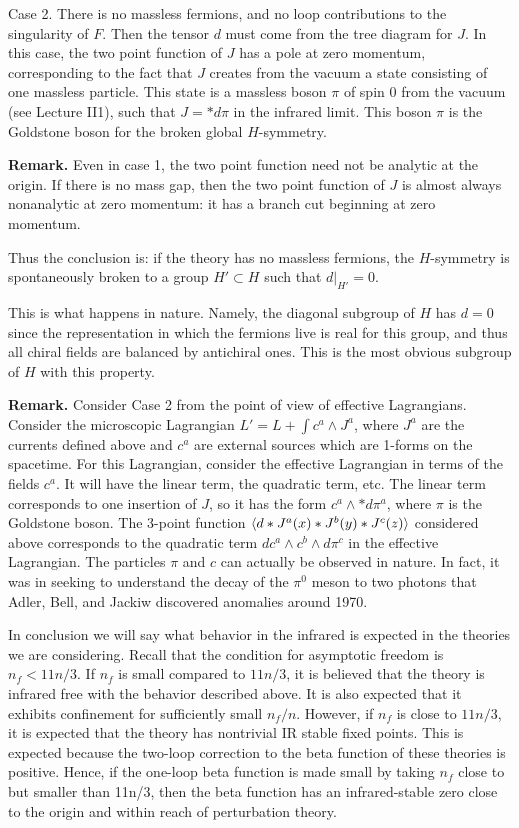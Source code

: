 Case 2. There is no massless fermions, and no loop contributions to the 
singularity of $F$.  
Then the tensor $d$ must come from the tree diagram for $J$. 
In this case, 
the two point function of $J$ has a pole at zero momentum,
corresponding to the fact that $J$ creates from the vacuum a state
consisting of one massless particle. 
This state is a
massless boson $\pi$ of spin 0 from the vacuum (see Lecture II1), such that 
$J=*d\pi$ in the infrared limit. This boson $\pi$ 
is the Goldstone boson for the broken global $H$-symmetry. 

{\bf Remark.} Even in case 1, the two point function need not be 
analytic at the origin. 
If there is no mass gap, then the two point function of $J$ is almost
always nonanalytic at zero momentum: it has a branch cut beginning
at zero momentum.

Thus the conclusion is: if the theory has no massless fermions, 
the $H$-symmetry is spontaneously broken to a group $H'\subset H$ 
such that $d|_{H'}=0$. 

This is what happens in nature. Namely, the diagonal subgroup of $H$ has $d=0$ 
since the representation in which the fermions live is real for this group, 
and thus all chiral fields are balanced by antichiral ones. 
This is the most obvious subgroup of $H$ with this property. 

{\bf Remark.} Consider Case 2 from the point of view of 
effective Lagrangians. Consider the microscopic Lagrangian 
$L'=L+\int c^a\wedge J^a$, where $J^a$ are the currents defined above and 
$c^a$ are external sources which are 1-forms on the spacetime. 
For this Lagrangian, 
consider the effective Lagrangian in terms of the fields $c^a$. 
It will have the linear term, the quadratic term, etc. The 
linear term corresponds to one insertion of $J$, so 
it has the form $c^a\wedge *d\pi^a$, where $\pi$ is the Goldstone boson. 
The 3-point function $\langle d*J^a(x) *J^b(y)*J^c(z)\rangle$ considered above 
corresponds to the quadratic term $dc^a\wedge c^b\wedge d\pi^c$
in the effective Lagrangian. The particles $\pi$ and $c$ can actually be 
observed in nature. In fact, it was in seeking
to understand the decay of the $\pi^0$ meson to two photons that
Adler, Bell, and Jackiw discovered anomalies around 1970. 

In conclusion we will say what behavior in the infrared is expected 
in the theories we are considering. Recall that the condition for asymptotic 
freedom is $n_f<11n/3$. If $n_f$ is small compared to $11n/3$, it is believed 
that the theory is infrared free with the behavior described above. 
It is also expected that it exhibits confinement for sufficiently 
small $n_f/n$. However, if $n_f$ is close to $11n/3$, it is expected 
that the theory has nontrivial IR stable fixed points. 
This is expected because the two-loop correction to the
beta function of these theories is positive.  Hence, if the one-loop
beta function is made small by taking $n_f$ close to  but smaller than
11n/3, then the
beta function has an infrared-stable zero close to the origin and within
reach of perturbation theory.

